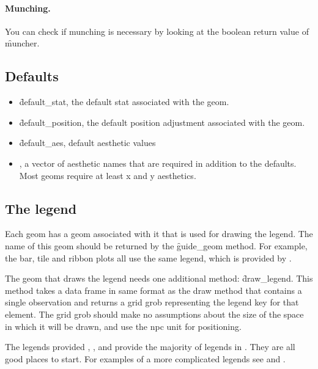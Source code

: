 \paragraph{Munching.} You can check if munching is necessary by looking at the boolean return value of \f{muncher}. 

\subsection{Defaults}
\label{sub:defaults}

\begin{itemize}
  \item \f{default_stat}, the default stat associated with the geom.
  
  \item \f{default_position}, the default position adjustment associated with the geom.

  \item \f{default_aes}, default aesthetic values
  
  \item {}, a vector of aesthetic names that are required in addition to the defaults.  Most geoms require at least x and y aesthetics.
  
\end{itemize}

\subsection{The legend}
\label{sub:the_legend}

Each geom has a geom associated with it that is used for drawing the legend.  The name of this geom should be returned by the \f{guide_geom} method.  For example, the bar, tile and ribbon plots all use the same legend, which is provided by .

The geom that draws the legend needs one additional method: \f{draw_legend}.  This method takes a data frame in same format as the draw method that contains a single observation and returns a grid grob representing the legend key for that element.  The grid grob should make no assumptions about the size of the space in which it will be drawn, and use the npc unit for positioning.

The legends provided , , and  provide the majority of legends in \ggplot.  They are all good places to start.  For examples of a more complicated legends see  and .

